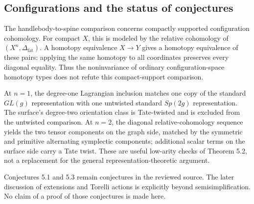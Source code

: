 \documentclass[10pt]{article}
\begin{document}
\subsection*{Configurations and the status of conjectures}
The handlebody-to-spine comparison concerns compactly supported configuration cohomology. For compact \(X\), this is modeled by the relative cohomology of \((X^n,\Delta_{\mathrm{fat}})\). A homotopy equivalence \(X\to Y\) gives a homotopy equivalence of these pairs: applying the same homotopy to all coordinates preserves every diagonal equality. Thus the noninvariance of ordinary configuration-space homotopy types does not refute this compact-support comparison.\par
At \(n=1\), the degree-one Lagrangian inclusion matches one copy of the standard \(GL(g)\) representation with one untwisted standard \(Sp(2g)\) representation. The surface’s degree-two orientation class is Tate-twisted and is excluded from the untwisted comparison. At \(n=2\), the diagonal relative-cohomology sequence yields the two tensor components on the graph side, matched by the symmetric and primitive alternating symplectic components; additional scalar terms on the surface side carry a Tate twist. These are useful low-arity checks of Theorem 5.2, not a replacement for the general representation-theoretic argument.\par
Conjectures 5.1 and 5.3 remain conjectures in the reviewed source. The later discussion of extensions and Torelli actions is explicitly beyond semisimplification. No claim of a proof of those conjectures is made here.\par
\end{document}
